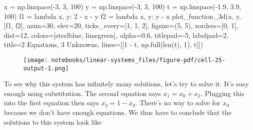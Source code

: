\documentclass[
  letterpaper,
  DIV=11,
  numbers=noendperiod]{scrreprt}
\newenvironment{Shaded}{\begin{snugshade}}{\end{snugshade}}
\newcommand{\BuiltInTok}[1]{\textcolor[rgb]{0.00,0.23,0.31}{#1}}
\newcommand{\DecValTok}[1]{\textcolor[rgb]{0.68,0.00,0.00}{#1}}
\newcommand{\FloatTok}[1]{\textcolor[rgb]{0.68,0.00,0.00}{#1}}
\newcommand{\KeywordTok}[1]{\textcolor[rgb]{0.00,0.23,0.31}{#1}}
\newcommand{\NormalTok}[1]{\textcolor[rgb]{0.00,0.23,0.31}{#1}}
\newcommand{\OperatorTok}[1]{\textcolor[rgb]{0.37,0.37,0.37}{#1}}
\newcommand{\StringTok}[1]{\textcolor[rgb]{0.13,0.47,0.30}{#1}}
\begin{document}
\begin{Shaded}
\begin{Highlighting}[]
\NormalTok{x }\OperatorTok{=}\NormalTok{ np.linspace(}\OperatorTok{{-}}\DecValTok{3}\NormalTok{, }\DecValTok{3}\NormalTok{, }\DecValTok{100}\NormalTok{)}
\NormalTok{y }\OperatorTok{=}\NormalTok{ np.linspace(}\OperatorTok{{-}}\DecValTok{3}\NormalTok{, }\DecValTok{3}\NormalTok{, }\DecValTok{100}\NormalTok{)}
\NormalTok{t }\OperatorTok{=}\NormalTok{ np.linspace(}\OperatorTok{{-}}\FloatTok{1.9}\NormalTok{, }\FloatTok{3.9}\NormalTok{, }\DecValTok{100}\NormalTok{)}
\NormalTok{f1 }\OperatorTok{=} \KeywordTok{lambda}\NormalTok{ x, y: }\DecValTok{2} \OperatorTok{{-}}\NormalTok{ x }\OperatorTok{{-}}\NormalTok{ y}
\NormalTok{f2 }\OperatorTok{=} \KeywordTok{lambda}\NormalTok{ x, y: y }\OperatorTok{{-}}\NormalTok{ x}
\NormalTok{plot\_function\_3d(x, y, [f1, f2], azim}\OperatorTok{=}\DecValTok{30}\NormalTok{, elev}\OperatorTok{=}\DecValTok{20}\NormalTok{, ticks\_every}\OperatorTok{=}\NormalTok{[}\DecValTok{1}\NormalTok{, }\DecValTok{1}\NormalTok{, }\DecValTok{2}\NormalTok{], figsize}\OperatorTok{=}\NormalTok{(}\DecValTok{5}\NormalTok{, }\DecValTok{5}\NormalTok{), zorders}\OperatorTok{=}\NormalTok{[}\DecValTok{0}\NormalTok{, }\DecValTok{1}\NormalTok{], dist}\OperatorTok{=}\DecValTok{12}\NormalTok{,}
\NormalTok{        colors}\OperatorTok{=}\NormalTok{[}\StringTok{\textquotesingle{}steelblue\textquotesingle{}}\NormalTok{, }\StringTok{\textquotesingle{}limegreen\textquotesingle{}}\NormalTok{], alpha}\OperatorTok{=}\FloatTok{0.6}\NormalTok{, titlepad}\OperatorTok{={-}}\DecValTok{5}\NormalTok{, labelpad}\OperatorTok{=}\DecValTok{2}\NormalTok{, title}\OperatorTok{=}\StringTok{\textquotesingle{}2 Equations, 3 Unknowns\textquotesingle{}}\NormalTok{,}
\NormalTok{        lines}\OperatorTok{=}\NormalTok{[[}\DecValTok{1} \OperatorTok{{-}}\NormalTok{ t, np.full(}\BuiltInTok{len}\NormalTok{(t), }\DecValTok{1}\NormalTok{), t]])}
\end{Highlighting}
\end{Shaded}

\begin{figure}[H]

{\centering \texttt{[image: notebooks/linear-systems\_files/figure-pdf/cell-25-output-1.png]}

}

\end{figure}

To see why this system has infinitely many solutions, let's try to solve
it. It's easy enough using substitution. The second equation says
\(x_1 = x_0 + x_2\). Plugging this into the first equation then says
\(x_2 = 1 - x_0\). There's no way to solve for \(x_0\) because we don't
have enough equations. We thus have to conclude that the solutions to
this system look like
\end{document}
